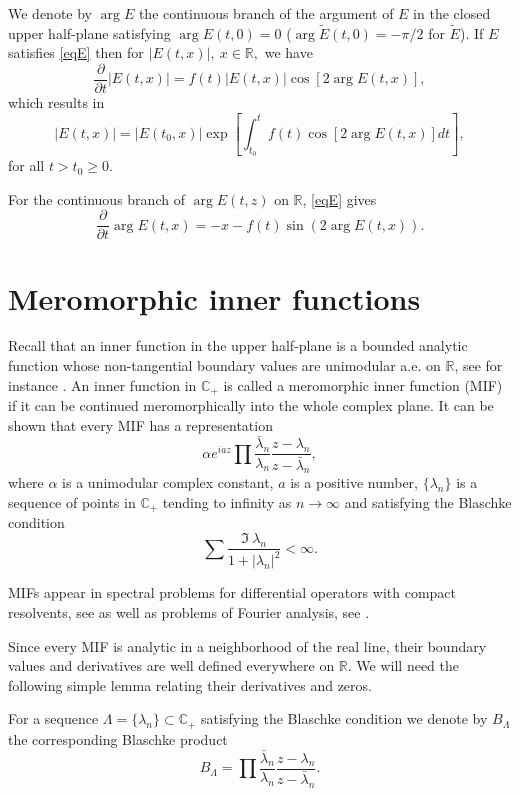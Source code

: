 \documentclass[11pt,twoside,reqno]{amsart}
\def\ti{\tilde}
\def\to{\rightarrow}
\def\pa{\partial}
\def\R{{\mathbb R}}
\def\C{{\mathbb{C}}}
\def\L{\Lambda}
\def\a{\alpha}
\def\lan{\lambda_n}
\theoremstyle{plain}
\numberwithin{equation}{section}
\begin{document}


We denote by $\arg E$ the continuous branch of the argument of $E$ in
the closed upper half-plane satisfying $\arg E(t,0)=0$ ($\arg \ti E(t,0)=-\pi/2$ for $\ti E$).
If $E$ satisfies \eqref{eqE} then for $|E(t,x)|,\ x\in\R,$ we have
$$\frac \pa {\pa  t} |E(t,x)|=f(t)|E(t,x)|\cos [2\arg E(t,x)],$$
which results in
\begin{equation} |E(t,x)|=|E(t_0,x)|\exp\left[\int_{t_0}^tf(t)\cos [2\arg E(t,x)] dt\right],
\label{eqmodE}\end{equation}
for all $t>t_0\geq 0$.

For the continuous branch of $\arg E(t,z)$ on $\R$, \eqref{eqE} gives
\begin{equation}
	 \frac \pa {\pa  t} \arg E(t,x)=-x - f (t)\sin (2\arg E (t,x)).
\label{eqArgE}
\end{equation}




\section{Meromorphic inner functions}\label{secMIF}



Recall that an inner function in the upper half-plane is a bounded analytic function whose non-tangential boundary values
are unimodular a.e. on $\R$, see for instance \cite{G}. An inner function in $\C_+$ is called a meromorphic inner function (MIF) if it can be
continued meromorphically into the whole complex plane. It can be shown that every MIF has a representation
$$\a e^{iaz} \prod \frac{\bar\lan}{\lan}\frac{z-\lan}{z-\bar\lan},
$$
where $\a$ is a unimodular complex constant, $a$ is a positive number, $\{\lan\}$ is a sequence of points in $\C_+$
tending to infinity as $n\to\infty$ and satisfying
the Blaschke condition
$$\sum \frac {\Im\  \lan}{1+|\lan |^2}<\infty.$$

MIFs appear in spectral problems for differential operators
with compact resolvents, see  \cite{MIF1, MIF2}  as well as problems of Fourier analysis,
see \cite{GAP, Type, CBMS}.



Since every MIF is analytic in a neighborhood of the real line, their boundary values and derivatives
are well defined everywhere on $\R$. We will need the following simple lemma relating their derivatives and zeros.

For a sequence $\L=\{\lan\}\subset \C_+$ satisfying the Blaschke condition we denote by $B_\L$ the corresponding
Blaschke product
$$B_\L= \prod \frac{\bar\lan}{\lan}\frac{z-\lan}{z-\bar\lan}.
$$
\end{document}

